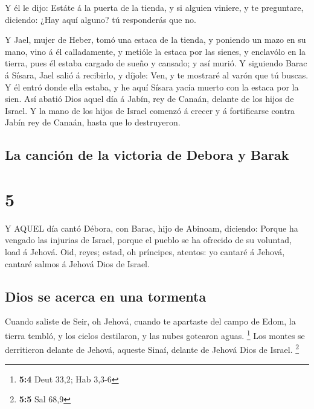  Y él le dijo: Estáte á la puerta de la tienda, y si
alguien viniere, y te preguntare, diciendo: ¿Hay aquí alguno? tú
responderás que no.

 Y Jael, mujer de Heber, tomó una estaca de la tienda, y
poniendo un mazo en su mano, vino á él calladamente, y metióle la estaca
por las sienes, y enclavólo en la tierra, pues él estaba cargado de
sueño y cansado; y así murió.  Y siguiendo Barac á Sísara,
Jael salió á recibirlo, y díjole: Ven, y te mostraré al varón que tú
buscas. Y él entró donde ella estaba, y he aquí Sísara yacía muerto con
la estaca por la sien.  Así abatió Dios aquel día á Jabín,
rey de Canaán, delante de los hijos de Israel.  Y la mano
de los hijos de Israel comenzó á crecer y á fortificarse contra Jabín
rey de Canaán, hasta que lo destruyeron.

\hypertarget{la-canciuxf3n-de-la-victoria-de-debora-y-barak}{%
\subsection{La canción de la victoria de Debora y
Barak}\label{la-canciuxf3n-de-la-victoria-de-debora-y-barak}}

\hypertarget{section-4}{%
\section{5}\label{section-4}}

 Y AQUEL día cantó Débora, con Barac, hijo de Abinoam,
diciendo:  Porque ha vengado las injurias de Israel, porque
el pueblo se ha ofrecido de su voluntad, load á Jehová. 
Oid, reyes; estad, oh príncipes, atentos: yo cantaré á Jehová, cantaré
salmos á Jehová Dios de Israel.

\hypertarget{dios-se-acerca-en-una-tormenta}{%
\subsection{Dios se acerca en una
tormenta}\label{dios-se-acerca-en-una-tormenta}}

 Cuando saliste de Seir, oh Jehová, cuando te apartaste del
campo de Edom, la tierra tembló, y los cielos destilaron, y las nubes
gotearon aguas. \footnote{\textbf{5:4} Deut 33,2; Hab 3,3-6}
 Los montes se derritieron delante de Jehová, aqueste Sinaí,
delante de Jehová Dios de Israel. \footnote{\textbf{5:5} Sal 68,9}

